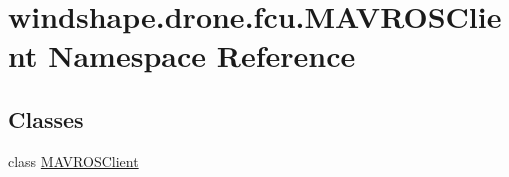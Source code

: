 \hypertarget{namespacewindshape_1_1drone_1_1fcu_1_1_m_a_v_r_o_s_client}{}\section{windshape.\+drone.\+fcu.\+M\+A\+V\+R\+O\+S\+Client Namespace Reference}
\label{namespacewindshape_1_1drone_1_1fcu_1_1_m_a_v_r_o_s_client}
\subsection*{Classes}
\begin{DoxyCompactItemize}
\item 
class \mbox{\hyperlink{classwindshape_1_1drone_1_1fcu_1_1_m_a_v_r_o_s_client_1_1_m_a_v_r_o_s_client}{M\+A\+V\+R\+O\+S\+Client}}
\end{DoxyCompactItemize}
